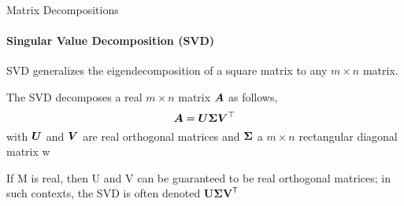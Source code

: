 \begin{frame}{Matrix Decompositions}
    \framesubtitle{Singular Value Decomposition (SVD)}
    SVD generalizes the eigendecomposition of a square matrix to any $m \times n$ matrix.

    \begin{boxed}
        The SVD decomposes a real $m \times n$ matrix $\bm{A}$ as follows,
        $$\bm{A} = \bm{U} \bm{\Sigma} \bm{V}^\top$$
        with $\bm{U}$ and $\bm{V}$ are real orthogonal matrices
        and $\bm{\Sigma} $ a $m \times n$ rectangular diagonal matrix w
    \end{boxed}

    If M is real, then U and V can be guaranteed to be real orthogonal matrices; in such contexts, the SVD is often denoted   $\displaystyle \mathbf {U\Sigma V} ^{\mathsf {T}}$
\end{frame}
